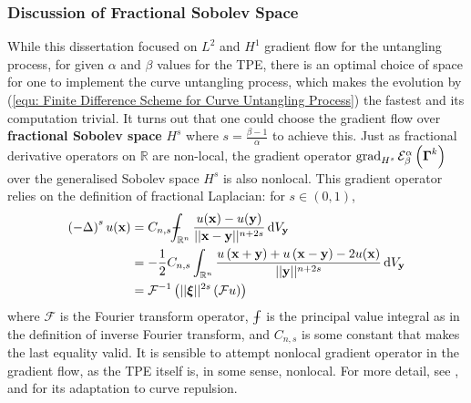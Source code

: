 \documentclass[../dissertation.tex]{subfiles}
\begin{document}
\subsubsection{Discussion of Fractional Sobolev Space}
\label{sct: Discussion of Fractional Sobolev Space}
While this dissertation focused on $L^2$ and $H^1$ gradient flow for the untangling process,
for given $\alpha$ and $\beta$ values for the TPE,
there is an optimal choice of space for one to implement the curve untangling process,
which makes the evolution by (\ref{equ: Finite Difference Scheme for Curve Untangling Process}) the fastest
and its computation trivial.
It turns out that one could choose the gradient flow over \textbf{fractional Sobolev space} $H^s$
where $s = \frac{\beta - 1}{\alpha}$ to achieve this\cite{YSC2021}.
Just as fractional derivative operators on $\mathbb{R}$ are non-local,
the gradient operator $\operatorname{grad}_{H^s} \mathcal{E}_{\beta}^{\alpha} \left( \boldsymbol{\Gamma}^k \right)$ over
the generalised Sobolev space $H^s$ is also nonlocal.
This gradient operator relies on the definition of fractional Laplacian\cite{DINEZZA2012521}:
for $s \in \left( 0,1 \right)$,
\begin{align}
    \left( -\laplacian \right)^s u(\xbf) &= C_{n,s} \dashint_{\mathbb{R}^n} \frac{u(\xbf) - u(\ybf)}{\norm{\xbf - \ybf}^{n+2s}} \intd V_{\ybf} \\
    &= -\frac{1}{2} C_{n,s} \int_{\mathbb{R}^n} \frac{u\left( \xbf + \ybf \right) + u\left( \xbf - \ybf \right) - 2 u(\xbf)}{\norm{\ybf}^{n+2s}} \intd V_{\ybf} \\
    &= \mathcal{F}^{-1} \left( \norm{\xibf}^{2s} \left( \mathcal{F} u \right) \right)
\end{align}
where $\mathcal{F}$ is the Fourier transform operator, $\dashint$ is the principal value integral as in the definition of inverse Fourier transform, and $C_{n,s}$ is some constant that makes the last equality valid.
It is sensible to attempt nonlocal gradient operator in the gradient flow, as the TPE itself is, in some sense, nonlocal.
For more detail, see \cite{DINEZZA2012521}, and \cite{YSC2021} for its adaptation to curve repulsion.
\end{document}
